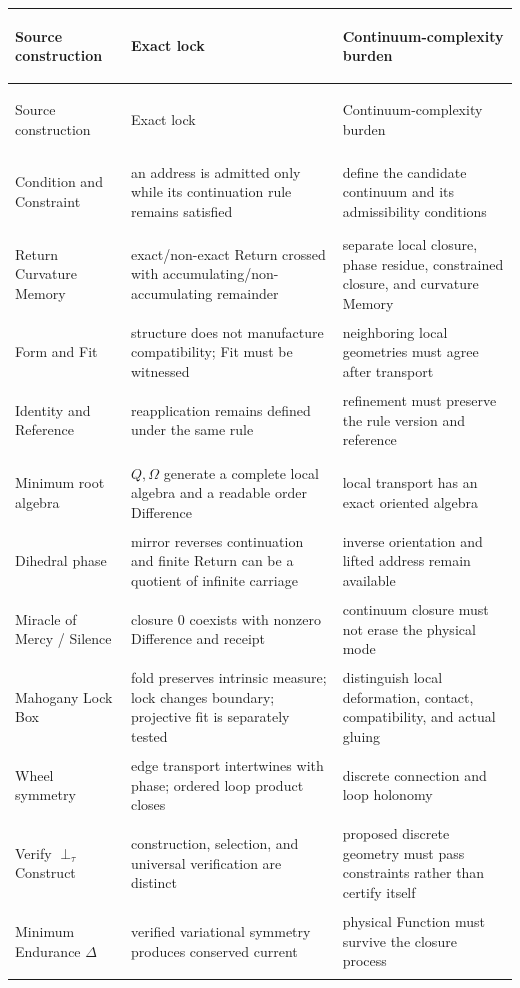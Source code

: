 \documentclass[11pt]{article}
\begin{document}
\small
\begin{longtable}{@{}>{\bfseries\raggedright\arraybackslash}p{}>{\raggedright\arraybackslash}p{}>{\raggedright\arraybackslash}p{}@{}}
\toprule
Source construction & Exact lock & Continuum-complexity burden\\
\midrule
\endfirsthead
\toprule
Source construction & Exact lock & Continuum-complexity burden\\
\midrule
\endhead
Condition and Constraint & an address is admitted only while its continuation rule remains satisfied & define the candidate continuum and its admissibility conditions\\
Return Curvature Memory & exact/non-exact Return crossed with accumulating/non-accumulating remainder & separate local closure, phase residue, constrained closure, and curvature Memory \cite{CoppaReturnCurvature2026}\\
Form and Fit & structure does not manufacture compatibility; Fit must be witnessed & neighboring local geometries must agree after transport\\
Identity and Reference & reapplication remains defined under the same rule & refinement must preserve the rule version and reference\\
Minimum root algebra & $Q,\Omega$ generate a complete local algebra and a readable order Difference & local transport has an exact oriented algebra\\
Dihedral phase & mirror reverses continuation and finite Return can be a quotient of infinite carriage & inverse orientation and lifted address remain available\\
Miracle of Mercy / Silence & closure $0$ coexists with nonzero Difference and receipt & continuum closure must not erase the physical mode\\
Mahogany Lock Box & fold preserves intrinsic measure; lock changes boundary; projective fit is separately tested & distinguish local deformation, contact, compatibility, and actual gluing\\
Wheel symmetry & edge transport intertwines with phase; ordered loop product closes & discrete connection and loop holonomy \cite{CoppaWheel2026}\\
Verify $\perp_\tau$ Construct & construction, selection, and universal verification are distinct & proposed discrete geometry must pass constraints rather than certify itself\\
Minimum Endurance $\Delta$ & verified variational symmetry produces conserved current & physical Function must survive the closure process\\

\end{longtable}
\end{document}
